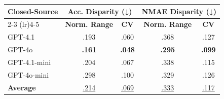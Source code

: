 \begin{tabular}{l c c c c}
\toprule
\multirow{2}{*}{\textbf{Closed-Source}} & \multicolumn{2}{c}{\textbf{Acc. Disparity (↓)}} & \multicolumn{2}{c}{\textbf{NMAE Disparity (↓)}} \\
\cmidrule(lr){2-3} \cmidrule(lr){4-5}
& \textbf{Norm. Range} & \textbf{CV} & \textbf{Norm. Range} & \textbf{CV} \\
\midrule
GPT-4.1 & .193 & .060 & .368 & .127 \\
GPT-4o & \textbf{.161} & \textbf{.048} & \textbf{.295} & \textbf{.099} \\
GPT-4.1-mini & .204 & .067 & .338 & .115 \\
GPT-4o-mini & .298 & .100 & .329 & .126 \\
\midrule
\textbf{Average} & \underline{.214} & \underline{.069} & \underline{.333} & \underline{.117} \\
\bottomrule
\end{tabular}
